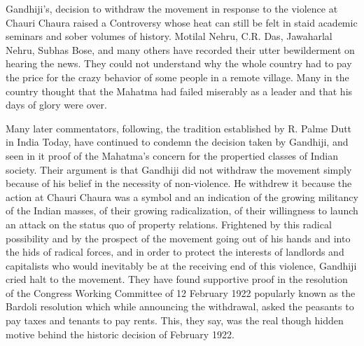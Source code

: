\begin{multicols}{2}
Gandhiji's, decision to withdraw the movement in response to the violence at Chauri Chaura raised a Controversy whose heat can still be felt in staid academic seminars and sober volumes of history. Motilal Nehru, C.R. Das, Jawaharlal Nehru, Subhas Bose, and many others have recorded their utter bewilderment on hearing the news. They could not understand why the whole country had to pay the price for the crazy behavior of some people in a remote village. Many in the country thought that the Mahatma had failed miserably as a leader and that his days of glory were over. 

Many later commentators, following, the tradition established by R. Palme Dutt in India Today, have continued to condemn the decision taken by Gandhiji, and seen in it proof of the Mahatma's concern for the propertied classes of Indian society. Their argument is that Gandhiji did not withdraw the movement simply because of his belief in the necessity of non-violence. He withdrew it because the action at Chauri Chaura was a symbol and an indication of the growing militancy of the Indian masses, of their growing radicalization, of their willingness to launch an attack on the status quo of property relations. Frightened by this radical possibility and by the prospect of the movement going out of his hands and into the hids of radical forces, and in order to protect the interests of landlords and capitalists who would inevitably be at the receiving end of this violence, Gandhiji cried halt to the movement. They have found supportive proof in the resolution of the Congress Working Committee of 12 February 1922 popularly known as the Bardoli resolution which while announcing the withdrawal, asked the peasants to pay taxes and tenants to pay rents. This, they say, was the real though hidden motive behind the historic decision of February 1922. 


\end{multicols}
